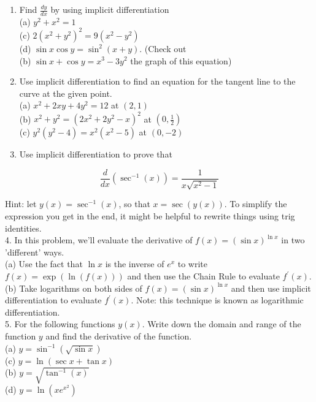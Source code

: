 \documentclass[10pt]{article}
\begin{document}
\begin{enumerate}
  \item Find $\frac{d y}{d x}$ by using implicit differentiation\\
(a) $y^{2}+x^{2}=1$\\
(c) $2\left(x^{2}+y^{2}\right)^{2}=9\left(x^{2}-y^{2}\right)$\\
(d) $\sin x \cos y=\sin ^{2}(x+y)$. (Check out\\
(b) $\sin x+\cos y=x^{3}-3 y^{2}$ the graph of this equation)
  \item Use implicit differentiation to find an equation for the tangent line to the curve at the given point.\\
(a) $x^{2}+2 x y+4 y^{2}=12$ at $(2,1)$\\
(b) $x^{2}+y^{2}=\left(2 x^{2}+2 y^{2}-x\right)^{2}$ at $\left(0, \frac{1}{2}\right)$\\
(c) $y^{2}\left(y^{2}-4\right)=x^{2}\left(x^{2}-5\right)$ at $(0,-2)$
  \item Use implicit differentiation to prove that
\end{enumerate}

$$
\frac{d}{d x}\left(\sec ^{-1}(x)\right)=\frac{1}{x \sqrt{x^{2}-1}}
$$

Hint: let $y(x)=\sec ^{-1}(x)$, so that $x=\sec (y(x))$. To simplify the expression you get in the end, it might be helpful to rewrite things using trig identities.\\
4. In this problem, we'll evaluate the derivative of $f(x)=(\sin x)^{\ln x}$ in two 'different' ways.\\
(a) Use the fact that $\ln x$ is the inverse of $e^{x}$ to write $f(x)=\exp (\ln (f(x)))$ and then use the Chain Rule to evaluate $f^{\prime}(x)$.\\
(b) Take logarithms on both sides of $f(x)=(\sin x)^{\ln x}$ and then use implicit differentiation to evaluate $f^{\prime}(x)$. Note: this technique is known as logarithmic differentiation.\\
5. For the following functions $y(x)$. Write down the domain and range of the function $y$ and find the derivative of the function.\\
(a) $y=\sin ^{-1}(\sqrt{\sin x})$\\
(c) $y=\ln (\sec x+\tan x)$\\
(b) $y=\sqrt{\tan ^{-1}(x)}$\\
(d) $y=\ln \left(x e^{x^{2}}\right)$
\end{document}
